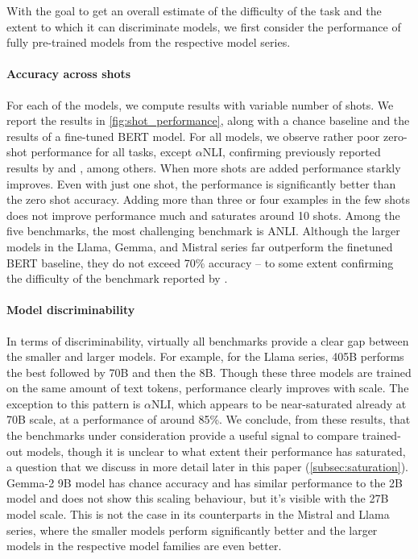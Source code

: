 With the goal to get an overall estimate of the difficulty of the task and the extent to which it can discriminate models, we first consider the performance of fully pre-trained models from the respective model series.

\paragraph{Accuracy across shots}
For each of the models, we compute results with variable number of shots.
We report the results in \cref{fig:shot_performance}, along with a chance baseline and the results of a fine-tuned BERT model.
For all models, we observe rather poor zero-shot performance for all tasks, except $\alpha$NLI, confirming previously reported results by \citet{ohmer2024form} and \citet{weber-etal-2023-mind}, among others.
When more shots are added performance starkly improves.
Even with just one shot, the performance is significantly better than the zero shot accuracy.
Adding more than three or four examples in the few shots does not improve performance much and saturates around 10 shots. 
Among the five benchmarks, the most challenging benchmark is ANLI.
Although the larger models in the Llama, Gemma, and Mistral series far outperform the finetuned BERT baseline, they do not exceed 70\% accuracy -- to some extent confirming the difficulty of the benchmark reported by \citet{brown2020language}.

\paragraph{Model discriminability}
In terms of discriminability, virtually all benchmarks provide a clear gap between the smaller and larger models.
For example, for the Llama series, 405B performs the best followed by 70B and then the 8B.
Though these three models are trained on the same amount of text tokens, performance clearly improves with scale.
The exception to this pattern is $\alpha$NLI, which appears to be near-saturated already at 70B scale, at a performance of around 85\%.
We conclude, from these results, that the benchmarks under consideration provide a useful signal to compare trained-out models, though it is unclear to what extent their performance has saturated, a question that we discuss in more detail later in this paper (\cref{subsec:saturation}).
Gemma-2 9B model has chance accuracy and has similar performance to the 2B model and does not show this scaling behaviour, but it's visible with the 27B model scale. This is not the case in its counterparts in the Mistral and Llama series, where the smaller models perform significantly better and the larger models in the respective model families are even better.

